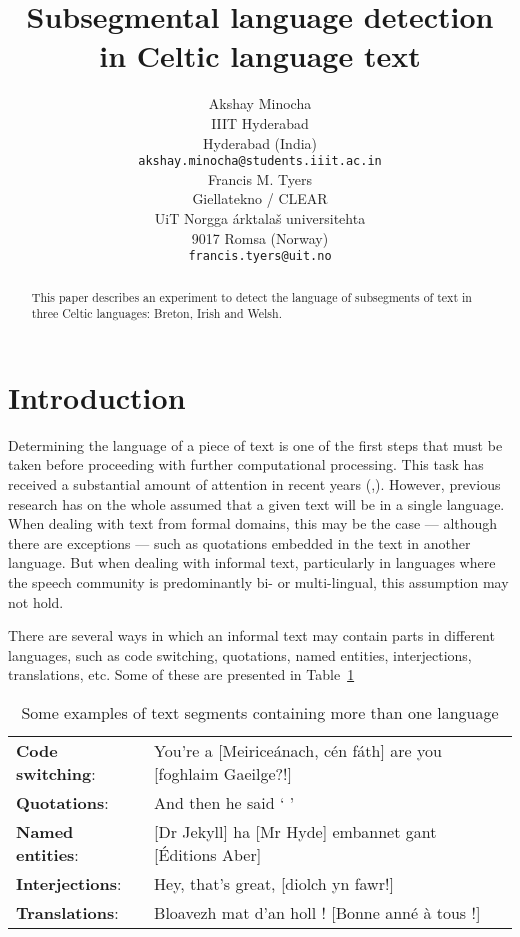 \documentclass[11pt]{article}
\title{Subsegmental language detection in Celtic language text}
\author{Akshay Minocha \\
  IIIT Hyderabad  \\
  Hyderabad (India) \\
  {\small {\tt akshay.minocha@students.iiit.ac.in}} \\\And
  Francis M. Tyers \\
  Giellatekno / CLEAR \\
  UiT Norgga \'arktala\v{s} universitehta  \\
  9017 Romsa (Norway) \\
  {\small {\tt francis.tyers@uit.no}} \\}
\date{}
\begin{document}
\maketitle
\begin{abstract}
  This paper describes an experiment to detect the language of subsegments
  of text in three Celtic languages: Breton, Irish and Welsh. 
\end{abstract}

\section{Introduction}
\label{intro}

Determining the language of a piece of text is one of the first steps that must be taken
before proceeding with further computational processing. This task has received a substantial amount of
attention in recent years (\cite{cavnar1994n},\cite{lui2012langid}). However, previous research has on the whole assumed
that a given text will be in a single language. When dealing with text from formal domains,
this may be the case --- although there are exceptions --- such as quotations embedded in
the text in another language. But when dealing with informal text, particularly in languages
where the speech community is predominantly bi- or multi-lingual, this assumption may not hold.

There are several ways in which an informal text may contain parts in different languages, such as
code switching, quotations, named entities, interjections, translations, etc. Some of these are presented
in Table~\ref{table:examples}

\begin{table}
\begin{tabular}{ll}
 \textbf{Code switching}: & You're a [Meirice\'{a}nach, c\'{e}n f\'{a}th] are you [foghlaim Gaeilge?!] \\
\textbf{Quotations}: & And then he said ` ' \\
 \textbf{Named entities}: & [Dr Jekyll] ha [Mr Hyde] embannet gant [\'{E}ditions Aber] \\
 \textbf{Interjections}: & Hey, that's great, [diolch yn fawr!] \\
 \textbf{Translations}: & Bloavezh mat d'an holl ! [Bonne ann\'{e} \`{a} tous !] \\
\end{tabular}
\label{table:examples}
\caption{Some examples of text segments containing more than one language}
\end{table}
\end{document}
